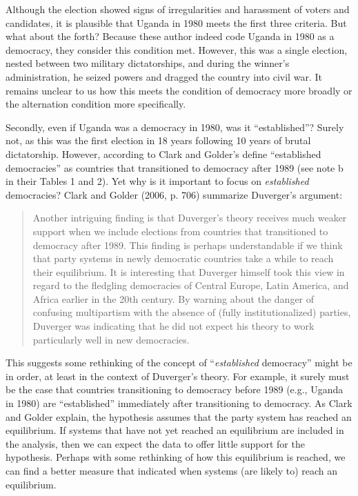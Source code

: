 \documentclass[12pt]{article}
\begin{document}
Although the election showed signs of irregularities and harassment of voters and candidates, it is plausible that Uganda in 1980 meets the first three criteria. 
But what about the forth? 
Because these author indeed code Uganda in 1980 as a democracy, they consider this condition met. 
However, this was a single election, nested between two military dictatorships, and during the winner's administration, he seized powers and dragged the country into civil war. 
It remains unclear to us how this meets the condition of democracy more broadly or the alternation condition more specifically.

Secondly, even if Uganda was a democracy in 1980, was it ``established''? 
Surely not, as this was the first election in 18 years following 10 years of brutal dictatorship. 
However, according to Clark and Golder's define ``established democracies'' as countries that transitioned to democracy after 1989 (see note b in their Tables 1 and 2). 
Yet why is it important to focus on \textit{established} democracies? Clark and Golder (2006, p. 706) summarize Duverger's argument: 

\begin{quote}
Another intriguing finding is that Duverger's theory receives much weaker support when we include elections from countries that transitioned to democracy after 1989. 
This finding is perhaps understandable if we think that party systems in newly democratic countries take a while to reach their equilibrium. 
It is interesting that Duverger himself took this view in regard to the fledgling democracies of Central Europe, Latin America, and Africa earlier in the 20th century. 
By warning about the danger of confusing multipartism with the absence of (fully institutionalized) parties, Duverger was indicating that he did not expect his theory to work particularly well in new democracies. 
\end{quote}

This suggests some rethinking of the concept of ``\textit{established} democracy'' might be in order, at least in the context of Duverger's theory. 
For example, it surely must be the case that countries transitioning to democracy before 1989 (e.g., Uganda in 1980) are ``established'' immediately after transitioning to democracy. 
As Clark and Golder explain, the hypothesis assumes that the party system has reached an equilibrium. If systems that have not yet reached an equilibrium are included in the analysis, then we can expect the data to offer little support for the hypothesis. 
Perhaps with some rethinking of how this equilibrium is reached, we can find a better measure that indicated when systems (are likely to) reach an equilibrium.
\end{document}
